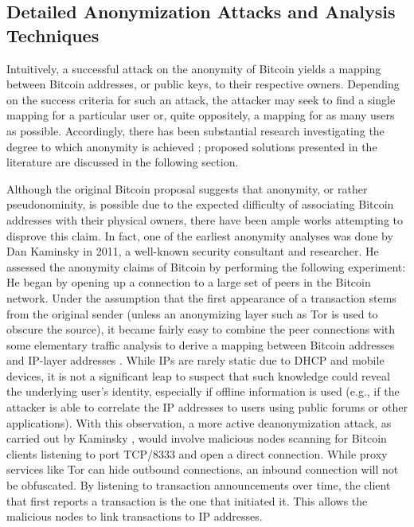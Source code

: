 \subsection{Detailed Anonymization Attacks and Analysis Techniques} \label{sec:attacks}

Intuitively, a successful attack on the anonymity of Bitcoin yields a mapping between Bitcoin addresses, or public keys, to their respective owners. Depending on the success criteria for such an attack, the attacker may seek to find a single mapping for a particular user or, quite oppositely, a mapping for as many users as possible. Accordingly, there has been substantial research investigating the degree to which anonymity is achieved \cite{ReidHarrigan13,BetterToBitter,Fistful12,Shamir13-bitcoingraph,Androulaki12-privacy}; proposed solutions presented in the literature are discussed in the following section.

Although the original Bitcoin proposal suggests that anonymity, or rather pseudonominity, is possible due to the expected difficulty of associating Bitcoin addresses with their physical owners, there have been ample works attempting to disprove this claim. In fact, one of the earliest anonymity analyses was done by Dan Kaminsky in 2011, a well-known security consultant and researcher. He assessed the anonymity claims of Bitcoin by performing the following experiment: He began by opening up a connection to a large set of peers in the Bitcoin network. Under the assumption that the first appearance of a transaction stems from the original sender (unless an anonymizing layer such as Tor is used to obscure the source), it became fairly easy to combine the peer connections with some elementary traffic analysis to derive a mapping between Bitcoin addresses and IP-layer addresses \cite{kaminsky}. While IPs are rarely static due to DHCP and mobile devices, it is not a significant leap to suspect that such knowledge could reveal the underlying user's identity, especially if offline information is used (e.g., if the attacker is able to correlate the IP addresses to users using public forums or other applications). With this observation, a more active deanonymization attack, as carried out by Kaminsky \cite{kaminsky,ReidHarrigan13}, would involve malicious nodes scanning for Bitcoin clients listening to port TCP/8333 and open a direct connection. While proxy services like Tor can hide outbound connections, an inbound connection will not be obfuscated. By listening to transaction announcements over time, the client that first reports a transaction is the one that initiated it. This allows the malicious nodes to link transactions to IP addresses.

